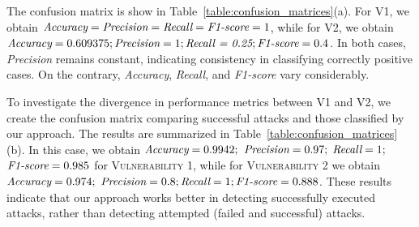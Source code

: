 

The confusion matrix is show in Table~\ref{table:confusion_matrices}(a). For {\sc V1}, we obtain \(\text{\em Accuracy} = \text{\em Precision} = \text{\em Recall} = \text{\em F1-score} = 1\), while for {\sc V2}, we obtain \(\text{\em Accuracy}= 0.609375; \text{\em Precision} = 1; \text{\em Recall = 0.25}; \text{\em F1-score} = 0.4\). In both cases, {\em Precision} remains constant, indicating consistency in classifying correctly positive cases. On the contrary, {\em Accuracy}, {\em Recall}, and {\em F1-score} vary considerably.


To investigate the divergence in performance metrics between {\sc V1} and {\sc V2}, we create the confusion matrix comparing successful attacks and those classified by our approach. The results are summarized in Table~\ref{table:confusion_matrices}(b). In this case, we obtain \(\text{\em Accuracy} = 0.9942;\) \(\text{\em Precision} = 0.97;\) \(\text{\em Recall} = 1;\) 
\(\text{\em F1-score} = 0.985\) for \textsc{Vulnerability 1}, while for \textsc{Vulnerability 2} we obtain \(\text{\em Accuracy} = 0.974;\) \(\text{\em Precision}  = 0.8; \text{\em Recall} = 1; \text{\em F1-score}  = 0.888\). These results indicate that our approach works better in detecting successfully executed attacks, rather than detecting attempted (failed and successful) attacks.

